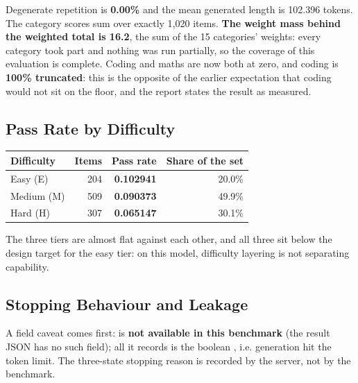 \documentclass[11pt,openany]{article}
\begin{document}
Degenerate repetition is \textbf{0.00\%} and the mean generated length is 102.396 tokens. The
category scores sum over exactly 1{,}020 items. \textbf{The weight mass behind the weighted total
is 16.2}, the sum of the 15 categories' weights: every category took part and nothing was run
partially, so the coverage of this evaluation is complete. Coding and maths are now both at zero,
and coding is \textbf{100\% truncated}: this is the opposite of the earlier expectation that
coding would not sit on the floor, and the report states the result as measured.

\subsection{Pass Rate by Difficulty}

\begin{center}\small
{}
\begin{tabular}{@{}lrrr@{}}
\toprule
\textbf{Difficulty} & \textbf{Items} & \textbf{Pass rate} & \textbf{Share of the set} \\
\midrule
Easy (E) & 204 & \textbf{0.102941} & 20.0\% \\
Medium (M) & 509 & \textbf{0.090373} & 49.9\% \\
Hard (H) & 307 & \textbf{0.065147} & 30.1\% \\
\bottomrule
\end{tabular}
\end{center}

The three tiers are almost flat against each other, and all three sit below the design target for
the easy tier: on this model, difficulty layering is not separating capability.

\subsection{Stopping Behaviour and Leakage}

A field caveat comes first:  is \textbf{not available in this benchmark} (the
result JSON has no such field); all it records is the boolean , i.e. generation hit
the token limit. The three-state stopping reason is recorded by the server, not by the benchmark.
\end{document}

